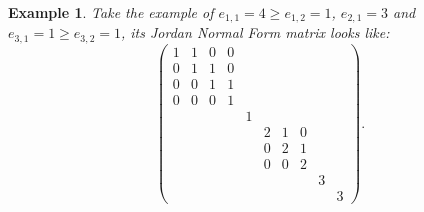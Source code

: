 \documentclass[12pt]{amsbook}
\newtheorem{example}[theorem]{Example}
\begin{document}
\begin{example}
    \medskip
    Take the example of $e_{1,1}= 4 \geq e_{1,2} = 1$, $e_{2,1} = 3$ and $e_{3,1} = 1 \geq e_{3,2} = 1$, its Jordan Normal Form matrix looks like:
$$\begin{pmatrix} 
1 & 1 & 0 & 0 & & & & & & \\
0 & 1 & 1 & 0 & & & & & & \\ 
0 & 0 & 1 & 1 & & & & & &\\
0 & 0 & 0 & 1 & & & & & &\\
& & & & 1 & & & & & \\
& & & &  & 2 & 1 & 0 & & \\
& & & &  & 0 & 2 & 1 & & \\
& & & &  & 0 & 0 & 2 & & \\
& & & &  &  &  &  & 3 & \\
& & & &  &  &  &  &  & 3
\end{pmatrix}.
$$

    
\end{example}
\end{document}
